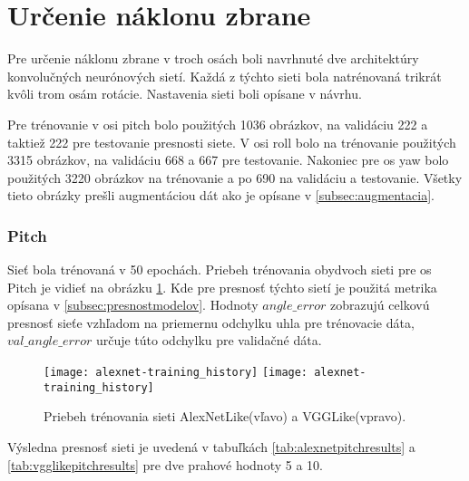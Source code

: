 
\section{Určenie náklonu zbrane}
Pre určenie náklonu zbrane v troch osách boli navrhnuté dve architektúry konvolučných neurónových sietí.
Každá z týchto sieti bola natrénovaná trikrát kvôli trom osám rotácie.
Nastavenia sieti boli opísane v návrhu.

Pre trénovanie v osi pitch bolo použitých 1036 obrázkov, na validáciu 222 a taktiež 222 pre testovanie presnosti siete.
V osi roll bolo na trénovanie použitých 3315 obrázkov, na validáciu 668 a 667 pre testovanie.
Nakoniec pre os yaw bolo použitých 3220 obrázkov na trénovanie a po 690 na validáciu a testovanie.
Všetky tieto obrázky prešli augmentáciou dát ako je opísane v \ref{subsec:augmentacia}.

\subsubsection{Pitch}
Sieť bola trénovaná v 50 epochách.
Priebeh trénovania obydvoch sieti pre os Pitch je vidieť na obrázku \ref{pic:pitchaxis}.
Kde pre presnosť týchto sietí je použitá metrika opísana v \ref{subsec:presnostmodelov}.
Hodnoty $angle\_error$ zobrazujú celkovú presnosť sieťe vzhľadom na priemernu odchylku uhla pre trénovacie dáta,
    $val\_angle\_error$ určuje túto odchylku pre validačné dáta.

\begin{figure}[H]
    \centering
    \texttt{[image: alexnet-training\_history]}
	\texttt{[image: alexnet-training\_history]} %
	\caption{Priebeh trénovania sieti AlexNetLike(vľavo) a VGGLike(vpravo).}
	\label{pic:pitchaxis}
\end{figure}

Výsledna presnosť sieti je uvedená v tabuľkách \ref{tab:alexnetpitchresults} a \ref{tab:vgglikepitchresults} pre dve prahové hodnoty 5 a 10.


